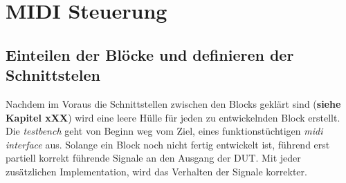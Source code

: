 
\chapter{MIDI Steuerung}\label{chap.midi}

\section{Einteilen der Blöcke und definieren der Schnittstelen}

Nachdem im Voraus die Schnittstellen zwischen den Blocks geklärt sind (\textbf{siehe Kapitel xXX}) wird eine leere Hülle für jeden zu entwickelnden Block erstellt. Die \textit{testbench} geht von Beginn weg vom Ziel, eines funktionstüchtigen \textit{midi interface} aus. Solange ein Block noch nicht fertig entwickelt ist, führend erst partiell korrekt führende Signale an den Ausgang der DUT. Mit jeder zusätzlichen Implementation, wird das Verhalten der Signale korrekter.\\



